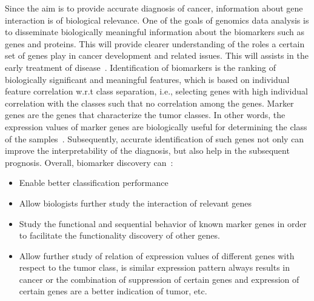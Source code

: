 \hspace*{3.5mm} Since the aim is to provide accurate diagnosis of cancer, information about gene interaction is of biological relevance. One of the goals of genomics data analysis is to disseminate biologically meaningful information about the biomarkers such as genes and proteins. This will provide clearer understanding of the roles a certain set of genes play in cancer development and related issues. This will assists in the  early treatment of disease~\cite{lu2003cancer}. %
Identification of biomarkers is the ranking of biologically significant and meaningful features, which is based on individual feature correlation w.r.t class separation, i.e., selecting genes with high individual correlation with the classes such that no correlation among the genes. Marker genes are the genes that characterize the tumor classes. In other words, the expression values of marker genes are biologically useful for determining the class of the samples~\cite{lu2003cancer}. Subsequently, accurate identification of such genes not only can improve the interpretability of the diagnosis, but also help in the subsequent prognosis. Overall, biomarker discovery can~\cite{lu2003cancer}:

\begin{itemize}[noitemsep]
    \item Enable better classification performance
    \item Allow biologists further study the interaction of relevant genes 
    \item Study the functional and sequential behavior of known marker genes in order to facilitate the functionality discovery of other genes.
    \item Allow further study of relation of expression values of different genes with respect to the tumor class, is similar expression pattern always results in cancer or the combination of suppression of certain genes and expression of certain genes are a better indication of tumor, etc.
\end{itemize}


